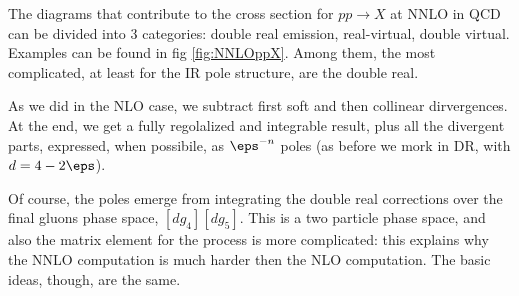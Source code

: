 \documentclass[11pt]{report}
\begin{document}
The diagrams that contribute to the cross section for \(pp \to X\) at NNLO in QCD can be divided into 3 categories: double real emission, real-virtual, double virtual. Examples can be found in fig \ref{fig:NNLOppX}. Among them, the most complicated, at least for the IR pole structure, are the double real. 

As we did in the NLO case, we subtract first soft and then collinear dirvergences. At the end, we get a fully regolalized and integrable result, plus all the divergent parts, expressed, when possibile, as \(\eps^{-n}\) poles (as before we mork in DR, with \(d = 4-2\eps\)).  

Of course, the poles emerge from integrating the double real corrections over the final gluons phase space, \([dg_4][dg_5]\). This is a two particle phase space, and also the matrix element for the process is more complicated: this explains why the NNLO computation is much harder then the NLO computation. The basic ideas, though, are the same.   
\end{document}
